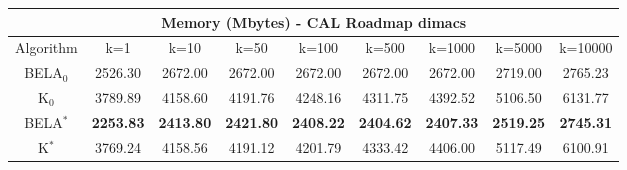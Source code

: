 \begin{tabular}{c|cccccccc}\toprule
\multicolumn{9}{c}{Memory (Mbytes) - CAL Roadmap dimacs}\\ \midrule
Algorithm & k=1 & k=10 & k=50 & k=100 & k=500 & k=1000 & k=5000 & k=10000 \\ \midrule
BELA$_0$ & 2526.30 & 2672.00 & 2672.00 & 2672.00 & 2672.00 & 2672.00 & 2719.00 & 2765.23 \\
K$_0$ & 3789.89 & 4158.60 & 4191.76 & 4248.16 & 4311.75 & 4392.52 & 5106.50 & 6131.77 \\
BELA$^*$ & \textbf{2253.83} & \textbf{2413.80} & \textbf{2421.80} & \textbf{2408.22} & \textbf{2404.62} & \textbf{2407.33} & \textbf{2519.25} & \textbf{2745.31} \\
K$^*$ & 3769.24 & 4158.56 & 4191.12 & 4201.79 & 4333.42 & 4406.00 & 5117.49 & 6100.91 \\ \bottomrule 
\end{tabular}

